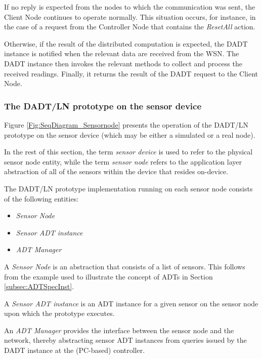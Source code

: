 If no reply is expected from the nodes to which the communication was sent, the Client Node continues to operate normally. This situation occurs, for instance, in the case of a request from the Controller Node
that contains the \emph{ResetAll} action. 
 
Otherwise, if the result of the distributed computation is expected, the DADT
instance is notified when the relevant data are received from the WSN.
The DADT instance then invokes the relevant methods to collect and process the received
readings. Finally, it returns the result of the DADT request to
the Client Node.

\subsubsection{The DADT/LN prototype on the sensor device} \label{subsubsec:DADTLNSensorDevice}

Figure \ref{Fig:SeqDiagram_Sensornode} presents the operation of the DADT/LN
prototype on the sensor device (which may be either a simulated or a real
node).

In the rest of this section, the term \emph{sensor device} is used to refer to the
physical sensor node entity, while the term \emph{sensor node} refers to the application
layer abstraction of all of the sensors within the device that resides on-device.

The DADT/LN prototype implementation running on each sensor node consists of the
following entities:

\begin{itemize}
  \item \emph{Sensor Node} 
  \item \emph{Sensor ADT instance} 
  \item \emph{ADT Manager} 
\end{itemize}

A \emph{Sensor Node} is an abstraction that consists of a list of sensors. This
follows from the example used to illustrate the concept of ADTs in Section
\ref{subsec:ADTSpecInst}. 

A \emph{Sensor ADT instance} is an ADT instance for a given sensor on the sensor
node upon which the prototype executes.

An \emph{ADT Manager} provides the interface between the sensor node and the
network, thereby abstracting sensor ADT instances from queries issued by the DADT
instance at the (PC-based) controller.

